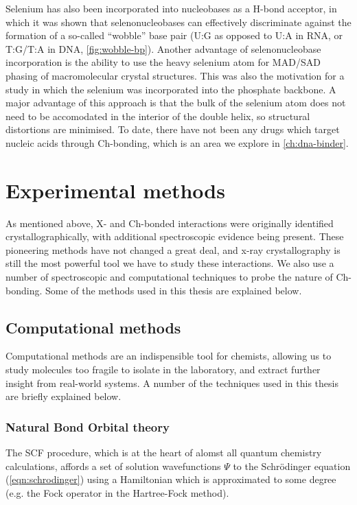 \begin{refsection}
Selenium has also been incorporated into nucleobases as a H-bond acceptor, in which it was shown that selenonucleobases can effectively discriminate against the formation of a so-called ``wobble'' base pair (U:G as opposed to U:A in RNA, or T:G/T:A in DNA, \cref{fig:wobble-bp}).\autocite{Hassan2010,Sun2012}
Another advantage of selenonucleobase incorporation is the ability to use the heavy selenium atom for MAD/SAD phasing of macromolecular crystal structures.\autocite{Salon2007}
This was also the motivation for a \citeyear{Conlon2019} study in which the selenium was incorporated into the phosphate backbone.\autocite{Conlon2019}
A major advantage of this approach is that the bulk of the selenium atom does not need to be accomodated in the interior of the double helix, so structural distortions are minimised.
To date, there have not been any drugs which target nucleic acids through Ch-bonding, which is an area we explore in \cref{ch:dna-binder}.

\section{Experimental methods}
As mentioned above, X- and Ch-bonded interactions were originally identified crystallographically, with additional spectroscopic evidence being present.
These pioneering methods have not changed a great deal, and x-ray crystallography is still the most powerful tool we have to study these interactions.
We also use a number of spectroscopic and computational techniques to probe the nature of Ch-bonding.
Some of the methods used in this thesis are explained below.

\subsection{Computational methods}
Computational methods are an indispensible tool for chemists, allowing us to study molecules too fragile to isolate in the laboratory, and extract further insight from real-world systems.
A number of the techniques used in this thesis are briefly explained below.

\subsubsection{Natural Bond Orbital theory}
The SCF procedure, which is at the heart of alomst all quantum chemistry calculations, affords a set of solution wavefunctions $\Psi$ to the Schr\"{o}dinger equation (\cref{eqn:schrodinger}) using a Hamiltonian which is approximated to some degree (e.g. the Fock operator in the Hartree-Fock method).


\end{refsection}

